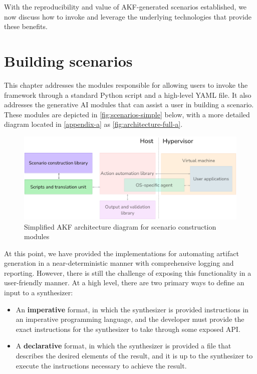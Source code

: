 \documentclass[letterpaper,12pt]{report}
\def\tightlist{}
\begin{document}
With the reproducibility and value of AKF-generated scenarios
established, we now discuss how to invoke and leverage the underlying
technologies that provide these benefits.

\chapter{Building scenarios}\label{chapter-six}

This chapter addresses the modules responsible for allowing users to
invoke the framework through a standard Python script and a high-level
YAML file. It also addresses the generative AI modules that can assist a
user in building a scenario. These modules are depicted in
\autoref{fig:scenarios-simple} below, with a more detailed diagram
located in \autoref{appendix-a} as
\autoref{fig:architecture-full-a}.

\begin{figure}[h]
\centering
\includegraphics[width=1\linewidth]{scenarios-simple.png}
\caption{Simplified AKF architecture diagram for scenario construction
modules}\label{fig:scenarios-simple}
\end{figure}

At this point, we have provided the implementations for automating
artifact generation in a near-deterministic manner with comprehensive
logging and reporting. However, there is still the challenge of exposing
this functionality in a user-friendly manner. At a high level, there are
two primary ways to define an input to a synthesizer:

\begin{itemize}
\tightlist
\item
  An \textbf{imperative} format, in which the synthesizer is provided
  instructions in an imperative programming language, and the developer
  must provide the exact instructions for the synthesizer to take
  through some exposed API.
\item
  A \textbf{declarative} format, in which the synthesizer is provided a
  file that describes the desired elements of the result, and it is up
  to the synthesizer to execute the instructions necessary to achieve
  the result.
\end{itemize}
\end{document}

